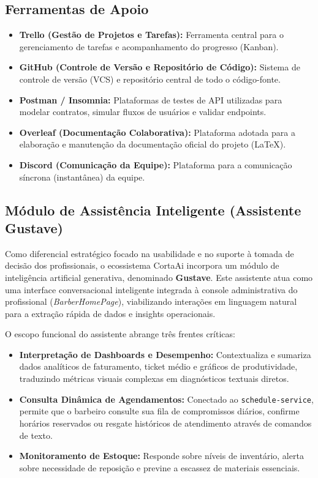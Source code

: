 \documentclass[
    12pt, 
    a4paper, 
    oneside, 
    chapter=TITLE, 
    section=TITLE
]{abntex2}
\begin{document}
\subsection{Ferramentas de Apoio}
\begin{itemize}
    \item \textbf{Trello (Gestão de Projetos e Tarefas):} Ferramenta central para o gerenciamento de tarefas e acompanhamento do progresso (Kanban).
    \item \textbf{GitHub (Controle de Versão e Repositório de Código):} Sistema de controle de versão (VCS) e repositório central de todo o código-fonte.
    \item \textbf{Postman / Insomnia:} Plataformas de testes de API utilizadas para modelar contratos, simular fluxos de usuários e validar endpoints.
    \item \textbf{Overleaf (Documentação Colaborativa):} Plataforma adotada para a elaboração e manutenção da documentação oficial do projeto (LaTeX).
    \item \textbf{Discord (Comunicação da Equipe):} Plataforma para a comunicação síncrona (instantânea) da equipe.
\end{itemize}

\subsection{Módulo de Assistência Inteligente (Assistente Gustave)}
Como diferencial estratégico focado na usabilidade e no suporte à tomada de decisão dos profissionais, o ecossistema CortaAi incorpora um módulo de inteligência artificial generativa, denominado \textbf{Gustave}. Este assistente atua como uma interface conversacional inteligente integrada à console administrativa do profissional (\textit{BarberHomePage}), viabilizando interações em linguagem natural para a extração rápida de dados e insights operacionais.

O escopo funcional do assistente abrange três frentes críticas:
\begin{itemize}
    \item \textbf{Interpretação de Dashboards e Desempenho:} Contextualiza e sumariza dados analíticos de faturamento, ticket médio e gráficos de produtividade, traduzindo métricas visuais complexas em diagnósticos textuais diretos.
    \item \textbf{Consulta Dinâmica de Agendamentos:} Conectado ao \texttt{schedule-service}, permite que o barbeiro consulte sua fila de compromissos diários, confirme horários reservados ou resgate históricos de atendimento através de comandos de texto.
    \item \textbf{Monitoramento de Estoque:} Responde sobre níveis de inventário, alerta sobre necessidade de reposição e previne a escassez de materiais essenciais.
\end{itemize}
\end{document}
